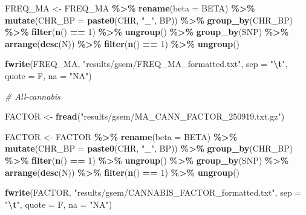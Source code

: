 \documentclass[
]{article}
\newenvironment{Shaded}{\begin{snugshade}}{\end{snugshade}}
\newcommand{\AttributeTok}[1]{\textcolor[rgb]{0.13,0.29,0.53}{#1}}
\newcommand{\CommentTok}[1]{\textcolor[rgb]{0.56,0.35,0.01}{\textit{#1}}}
\newcommand{\DecValTok}[1]{\textcolor[rgb]{0.00,0.00,0.81}{#1}}
\newcommand{\FunctionTok}[1]{\textcolor[rgb]{0.13,0.29,0.53}{\textbf{#1}}}
\newcommand{\NormalTok}[1]{#1}
\newcommand{\OtherTok}[1]{\textcolor[rgb]{0.56,0.35,0.01}{#1}}
\newcommand{\SpecialCharTok}[1]{\textcolor[rgb]{0.81,0.36,0.00}{\textbf{#1}}}
\newcommand{\StringTok}[1]{\textcolor[rgb]{0.31,0.60,0.02}{#1}}
\begin{document}
\begin{Shaded}
\begin{Highlighting}[]
\NormalTok{FREQ\_MA }\OtherTok{\textless{}{-}}\NormalTok{ FREQ\_MA }\SpecialCharTok{\%\textgreater{}\%} 
  \FunctionTok{rename}\NormalTok{(}\AttributeTok{beta =}\NormalTok{ BETA) }\SpecialCharTok{\%\textgreater{}\%} 
  \FunctionTok{mutate}\NormalTok{(}\AttributeTok{CHR\_BP =} \FunctionTok{paste0}\NormalTok{(CHR, }\StringTok{"\_"}\NormalTok{, BP)) }\SpecialCharTok{\%\textgreater{}\%} 
  \FunctionTok{group\_by}\NormalTok{(CHR\_BP) }\SpecialCharTok{\%\textgreater{}\%} 
  \FunctionTok{filter}\NormalTok{(}\FunctionTok{n}\NormalTok{() }\SpecialCharTok{==} \DecValTok{1}\NormalTok{) }\SpecialCharTok{\%\textgreater{}\%} 
  \FunctionTok{ungroup}\NormalTok{() }\SpecialCharTok{\%\textgreater{}\%} 
  \FunctionTok{group\_by}\NormalTok{(SNP) }\SpecialCharTok{\%\textgreater{}\%} 
  \FunctionTok{arrange}\NormalTok{(}\FunctionTok{desc}\NormalTok{(N)) }\SpecialCharTok{\%\textgreater{}\%} 
  \FunctionTok{filter}\NormalTok{(}\FunctionTok{n}\NormalTok{() }\SpecialCharTok{==} \DecValTok{1}\NormalTok{) }\SpecialCharTok{\%\textgreater{}\%} 
  \FunctionTok{ungroup}\NormalTok{() }

\FunctionTok{fwrite}\NormalTok{(FREQ\_MA, }\StringTok{"results/gsem/FREQ\_MA\_formatted.txt"}\NormalTok{, }\AttributeTok{sep =} \StringTok{"}\SpecialCharTok{\textbackslash{}t}\StringTok{"}\NormalTok{, }\AttributeTok{quote =}\NormalTok{ F, }\AttributeTok{na =} \StringTok{"NA"}\NormalTok{)}

\CommentTok{\# All{-}cannabis}

\NormalTok{FACTOR }\OtherTok{\textless{}{-}} \FunctionTok{fread}\NormalTok{(}\StringTok{"results/gsem/MA\_CANN\_FACTOR\_250919.txt.gz"}\NormalTok{)}

\NormalTok{FACTOR }\OtherTok{\textless{}{-}}\NormalTok{ FACTOR }\SpecialCharTok{\%\textgreater{}\%} 
  \FunctionTok{rename}\NormalTok{(}\AttributeTok{beta =}\NormalTok{ BETA) }\SpecialCharTok{\%\textgreater{}\%} 
  \FunctionTok{mutate}\NormalTok{(}\AttributeTok{CHR\_BP =} \FunctionTok{paste0}\NormalTok{(CHR, }\StringTok{"\_"}\NormalTok{, BP)) }\SpecialCharTok{\%\textgreater{}\%} 
  \FunctionTok{group\_by}\NormalTok{(CHR\_BP) }\SpecialCharTok{\%\textgreater{}\%} 
  \FunctionTok{filter}\NormalTok{(}\FunctionTok{n}\NormalTok{() }\SpecialCharTok{==} \DecValTok{1}\NormalTok{) }\SpecialCharTok{\%\textgreater{}\%} 
  \FunctionTok{ungroup}\NormalTok{() }\SpecialCharTok{\%\textgreater{}\%} 
  \FunctionTok{group\_by}\NormalTok{(SNP) }\SpecialCharTok{\%\textgreater{}\%} 
  \FunctionTok{arrange}\NormalTok{(}\FunctionTok{desc}\NormalTok{(N)) }\SpecialCharTok{\%\textgreater{}\%} 
  \FunctionTok{filter}\NormalTok{(}\FunctionTok{n}\NormalTok{() }\SpecialCharTok{==} \DecValTok{1}\NormalTok{) }\SpecialCharTok{\%\textgreater{}\%} 
  \FunctionTok{ungroup}\NormalTok{() }

\FunctionTok{fwrite}\NormalTok{(FACTOR, }\StringTok{"results/gsem/CANNABIS\_FACTOR\_formatted.txt"}\NormalTok{, }\AttributeTok{sep =} \StringTok{"}\SpecialCharTok{\textbackslash{}t}\StringTok{"}\NormalTok{, }\AttributeTok{quote =}\NormalTok{ F, }\AttributeTok{na =} \StringTok{"NA"}\NormalTok{)}
\end{Highlighting}
\end{Shaded}
\end{document}

